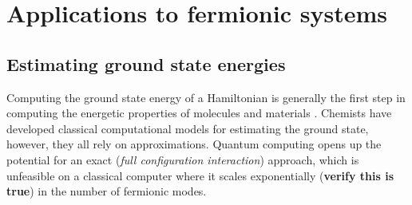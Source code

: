 \documentclass[twoside]{article}
\begin{document}
\section{Applications to fermionic systems}\label{applications_section}
\subsection{Estimating ground state energies}\label{vqe_section}
Computing the ground state energy of a Hamiltonian is generally the first step in computing the energetic properties of molecules and materials \cite{vqe}. Chemists have developed classical computational models for estimating the ground state, however, they all rely on approximations. Quantum computing opens up the potential for an exact (\textit{full configuration interaction}) approach, which is unfeasible on a classical computer where it scales exponentially (\textbf{verify this is true}) in the number of fermionic modes.
\end{document}
